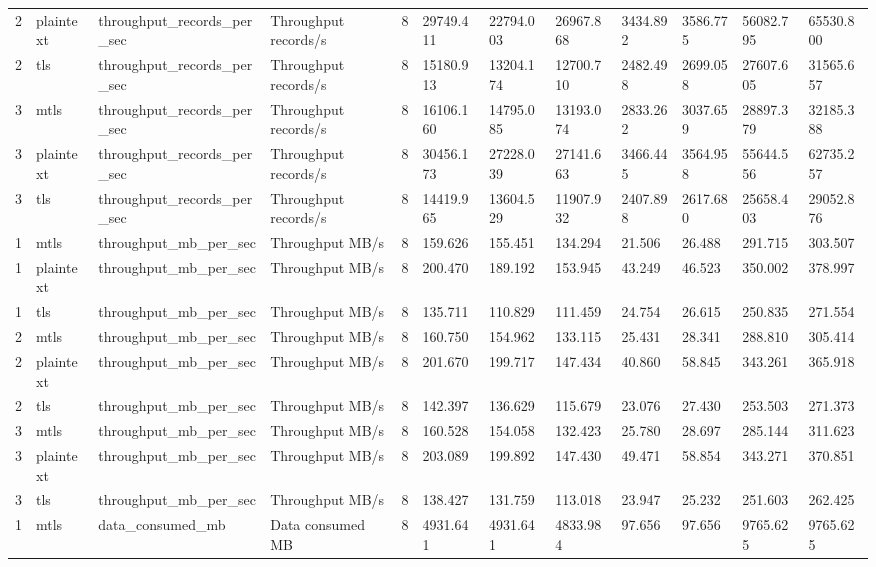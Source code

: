 \begin{longtable}{llllllllllll}
2 & plaintext & throughput\_records\_per\_sec & Throughput records/s & 8 & 29749.411 & 22794.003 & 26967.868 & 3434.892 & 3586.775 & 56082.795 & 65530.800 \\
2 & tls & throughput\_records\_per\_sec & Throughput records/s & 8 & 15180.913 & 13204.174 & 12700.710 & 2482.498 & 2699.058 & 27607.605 & 31565.657 \\
3 & mtls & throughput\_records\_per\_sec & Throughput records/s & 8 & 16106.160 & 14795.085 & 13193.074 & 2833.262 & 3037.659 & 28897.379 & 32185.388 \\
3 & plaintext & throughput\_records\_per\_sec & Throughput records/s & 8 & 30456.173 & 27228.039 & 27141.663 & 3466.445 & 3564.958 & 55644.556 & 62735.257 \\
3 & tls & throughput\_records\_per\_sec & Throughput records/s & 8 & 14419.965 & 13604.529 & 11907.932 & 2407.898 & 2617.680 & 25658.403 & 29052.876 \\
1 & mtls & throughput\_mb\_per\_sec & Throughput MB/s & 8 & 159.626 & 155.451 & 134.294 & 21.506 & 26.488 & 291.715 & 303.507 \\
1 & plaintext & throughput\_mb\_per\_sec & Throughput MB/s & 8 & 200.470 & 189.192 & 153.945 & 43.249 & 46.523 & 350.002 & 378.997 \\
1 & tls & throughput\_mb\_per\_sec & Throughput MB/s & 8 & 135.711 & 110.829 & 111.459 & 24.754 & 26.615 & 250.835 & 271.554 \\
2 & mtls & throughput\_mb\_per\_sec & Throughput MB/s & 8 & 160.750 & 154.962 & 133.115 & 25.431 & 28.341 & 288.810 & 305.414 \\
2 & plaintext & throughput\_mb\_per\_sec & Throughput MB/s & 8 & 201.670 & 199.717 & 147.434 & 40.860 & 58.845 & 343.261 & 365.918 \\
2 & tls & throughput\_mb\_per\_sec & Throughput MB/s & 8 & 142.397 & 136.629 & 115.679 & 23.076 & 27.430 & 253.503 & 271.373 \\
3 & mtls & throughput\_mb\_per\_sec & Throughput MB/s & 8 & 160.528 & 154.058 & 132.423 & 25.780 & 28.697 & 285.144 & 311.623 \\
3 & plaintext & throughput\_mb\_per\_sec & Throughput MB/s & 8 & 203.089 & 199.892 & 147.430 & 49.471 & 58.854 & 343.271 & 370.851 \\
3 & tls & throughput\_mb\_per\_sec & Throughput MB/s & 8 & 138.427 & 131.759 & 113.018 & 23.947 & 25.232 & 251.603 & 262.425 \\
1 & mtls & data\_consumed\_mb & Data consumed MB & 8 & 4931.641 & 4931.641 & 4833.984 & 97.656 & 97.656 & 9765.625 & 9765.625 \\

\end{longtable}
